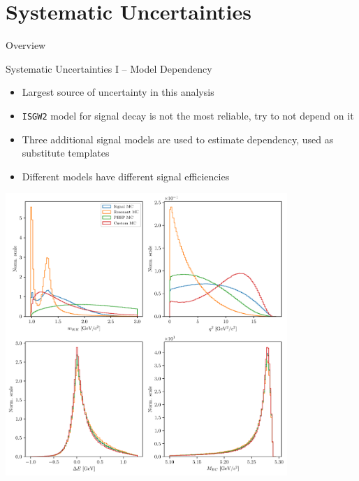 \documentclass[serif]{beamer}
\begin{document}
\section{Systematic Uncertainties} 

\begin{frame}[t]{Overview}
\end{frame}


\begin{frame}[t]{Systematic Uncertainties I -- Model Dependency}

\vspace{-3mm}
\small

\begin{itemize}
	\item Largest source of uncertainty in this analysis
	\item \texttt{ISGW2} model for signal decay is not the most reliable, try to not depend on it
	\item Three additional signal models are used to estimate dependency, used as substitute templates
	\item Different models have different signal efficiencies
\end{itemize}
\vspace{-2mm}

	\begin{center}
		\includegraphics[width=0.8\textwidth, trim={0 10cm 0 0},clip]{fig/model_cases}
	\end{center}	


\end{frame}
\end{document}
